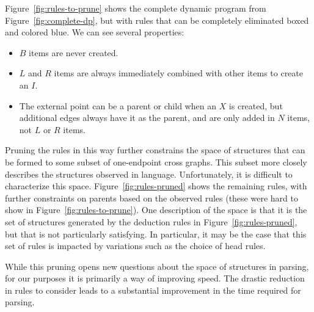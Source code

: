 Figure~\ref{fig:rules-to-prune} shows the complete dynamic program from Figure~\ref{fig:complete-dp}, but with rules that can be completely eliminated boxed and colored blue.
We can see several properties:

\begin{itemize}
  \item $B$ items are never created.
  \item $L$ and $R$ items are always immediately combined with other items to create an $I$.
  \item The external point can be a parent or child when an $X$ is created, but additional edges always have it as the parent, and are only added in $N$ items, not $L$ or $R$ items.
\end{itemize}

Pruning the rules in this way further constrains the space of structures that can be formed to some subset of one-endpoint cross graphs.
This subset more closely describes the structures observed in language.
Unfortunately, it is difficult to characterize this space.
Figure~\ref{fig:rules-pruned} shows the remaining rules, with further constraints on parents based on the observed rules (these were hard to show in Figure~\ref{fig:rules-to-prune}).
One description of the space is that it is the set of structures generated by the deduction rules in Figure~\ref{fig:rules-pruned}, but that is not particularly satisfying.
In particular, it may be the case that this set of rules is impacted by variations such as the choice of head rules.

While this pruning opens new questions about the space of structures in parsing, for our purposes it is primarily a way of improving speed.
The drastic reduction in rules to consider leads to a substantial improvement in the time required for parsing.





